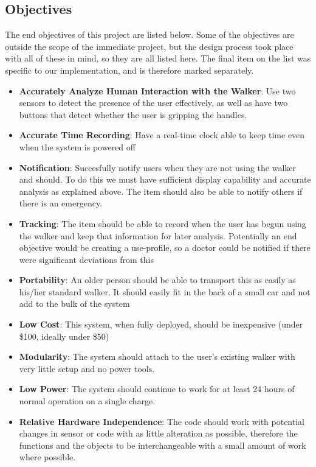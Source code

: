\documentclass{article}
\begin{document}
\subsection{Objectives}
The end objectives of this project are listed below. Some of the objectives are outside the scope of the immediate project, but the design process took place with all of these in mind, so they are all listed here. The final item on the list was specific to our implementation, and is therefore marked separately. 
\begin{itemize}
	\item \textbf{Accurately Analyze Human Interaction with the Walker}: Use two sensors to detect the presence of the user effectively, as well as have two buttons that detect whether the user is gripping the handles. 
	\item \textbf{Accurate Time Recording}: Have a real-time clock able to keep time even when the system is powered off
	\item \textbf{Notification}: Succesfully notify users when they are not using the walker and should. To do this we must have sufficient display capability and accurate analysis as explained above. The item should also be able to notify others if there is an emergency.
	\item \textbf{Tracking}: The item should be able to record when the user has begun using the walker and keep that information for later analysis. Potentially an end objective would be creating a use-profile, so a doctor could be notified if there were significant deviations from this 
	\item \textbf{Portability}: An older person should be able to transport this as easily as his/her standard walker. It should easily fit in the back of a small car and not add to the bulk of the system
	\item \textbf{Low Cost}: This system, when fully deployed, should be inexpensive (under \$100, ideally under \$50)
	\item \textbf{Modularity}: The system should attach to the user's existing walker with very little setup and no power tools. 
	\item \textbf{Low Power}: The system should continue to work for at least 24 hours of normal operation on a single charge. 
	\item[\textasteriskcentered] \textbf{Relative Hardware Independence}: The code should work with potential changes in sensor or code with as little alteration as possible, therefore the functions and the objects to be interchangeable with a small amount of work where possible. 
\end{itemize}
\end{document}
